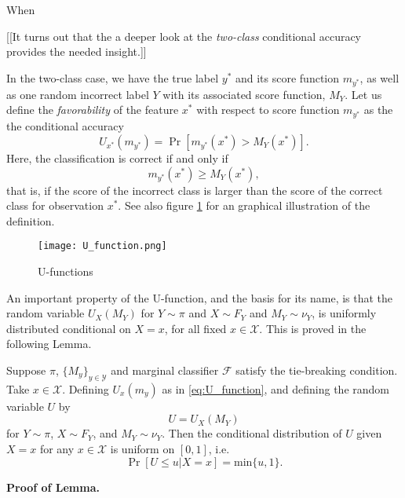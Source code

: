 \documentclass[12pt]{article}
\begin{document}
When 

[[It turns out that the a deeper look at the \emph{two-class} conditional accuracy provides the needed insight.]]

In the two-class case, we have the true label $y^*$ and its score function $m_{y^*}$, 
as well as one random incorrect label $Y$ with its associated score function, $M_Y$.
Let us define the \emph{favorability} of the feature $x^*$ with respect to score function $m_{y^*}$ as the the conditional accuracy 
\begin{equation}\label{eq:U_function}
U_{x^*}(m_{y^*}) = \Pr[m_{y^*}(x^*) > M_Y(x^*)].
\end{equation}
Here, the classification is correct if and
only if \[m_{y^*}(x^*) \geq M_Y(x^*),\] that is, if the score of the
incorrect class is larger than the score of the correct class for
observation $x^*$.
See also figure \ref{fig:U_function} for an graphical illustration of
the definition.

\begin{figure}[h]
\centering
\texttt{[image: U\_function.png]}
\caption{U-functions}\label{fig:U_function}
\end{figure}

An important property of the U-function, and the basis for its name, is that the random variable $U_X(M_Y)$ for $Y \sim \pi$ and $X \sim F_Y$ and $M_Y \sim \nu_Y$, is uniformly distributed
conditional on $X=x$, for all fixed $x \in \mathcal{X}$.  This is
proved in the following Lemma.

\begin{lemma}\label{lemma:U_function}
Suppose $\pi$, $\{M_y\}_{y \in \mathcal{Y}}$ and marginal classifier
$\mathcal{F}$ satisfy the tie-breaking condition.  Take $x \in \mathcal{X}$.  Defining
$U_x(m_y)$ as in \eqref{eq:U_function}, and defining the
random variable $U$ by
\[U = U_X(M_Y)\]
for $Y \sim \pi$, $X \sim F_Y$, and $M_Y \sim \nu_Y$.  Then
the conditional distribution of $U$ given $X = x$ for any $x \in
\mathcal{X}$ is uniform on $[0,1]$, i.e.
\[
\Pr[U \leq u|X =x] = \text{min}\{u, 1\}.
\]
\end{lemma}

\textbf{Proof of Lemma.}

\end{document}
